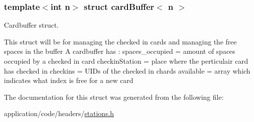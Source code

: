 \subsubsection*{template$<$int n$>$\newline
struct card\+Buffer$<$ n $>$}

Cardbuffer struct. 

This struct will be for managing the checked in cards and managing the free spaces in the buffer A cardbuffer has \+: spaces\+\_\+occupied = amount of spaces occupied by a checked in card checkin\+Station = place where the perticulair card has checked in checkins = U\+ID\textquotesingle{}s of the checked in chards available = array which indicates what index is free for a new card 

The documentation for this struct was generated from the following file\+:\begin{DoxyCompactItemize}
\item 
application/code/headers/\hyperlink{stations_8h}{stations.\+h}\end{DoxyCompactItemize}
